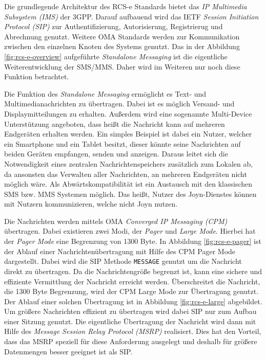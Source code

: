 \documentclass[german,12pt,a4paper]{article}
\begin{document}
    Die grundlegende Architektur des RCS-e Standards bietet das \textit{IP Multimedia Subsystem
    (IMS)} der 3GPP. Darauf aufbauend wird das IETF \textit{Session Initiation Protocol (SIP)} zur
    Authentifizierung, Autorisierung, Registrierug und Abrechnung genutzt. Weitere OMA Standards
    werden zur Kommunikation zwischen den einzelnen Knoten des Systems genutzt. Das in der Abbildung
    \ref{fig:rcs-e-overview} aufgeführte \textit{Standalone Messaging} ist die eigentliche
    Weiterentwicklung der SMS/MMS. Daher wird im Weiteren nur noch diese Funktion betrachtet.

    Die Funktion des \textit{Standalone Messaging} ermöglicht es Text- und Multimedianachrichten
    zu übertragen. Dabei ist es möglich Versand- und Displaymitteilungen zu erhalten. Außerdem wird
    eine sogenannte Multi-Device Unterstützung angeboten, dass heißt die Nachricht kann auf
    mehreren Endgeräten erhalten werden. Ein simples Beispiel ist dabei ein Nutzer, welcher ein
    Smartphone und ein Tablet besitzt, dieser könnte seine Nachrichten auf beiden Geräten
    empfangen, senden und anzeigen. Daraus leitet sich die Notwendigkeit eines zentralen
    Nachrichtenspeichers zusätzlich zum Lokalen ab, da ansonsten das Verwalten aller
    Nachrichten, an mehreren Endgeräten nicht möglich wäre. Als Abwärtskompatibilität ist
    ein Austausch mit den klassischen SMS bzw. MMS Systemen möglich. Das heißt, Nutzer des
    Joyn-Dienstes können mit Nutzern kommunizieren, welche nicht Joyn nutzen.

    Die Nachrichten werden mittels OMA \textit{Converged IP Messaging (CPM)} übertragen. Dabei
    existieren zwei Modi, der \textit{Pager} und \textit{Large Mode}. Hierbei hat der
    \textit{Pager Mode} eine Begrenzung von 1300 Byte. In Abbildung \ref{fig:rcs-e-pager} ist
    der Ablauf einer Nachrichtenübertragung mit Hilfe des CPM Pager Mode dargestellt. Dabei wird
    die SIP Methode \texttt{MESSAGE} genutzt um die Nachricht direkt zu übertragen. Da die
    Nachrichtengröße begrenzt ist, kann eine sichere und effiziente Vermittlung der Nachricht
    erreicht werden. Überschreitet die Nachricht, die 1300 Byte Begrenzung, wird der CPM
    Large Mode zur Übertragung genutzt. Der Ablauf einer solchen Übertragung ist in
    Abbildung \ref{fig:rcs-e-large} abgebildet. Um größere Nachrichten effizient zu übertragen
    wird dabei SIP nur zum Aufbau einer Sitzung genutzt. Die eigentliche Übertragung der Nachricht
    wird dann mit Hilfe des \textit{Message Session Relay Protocol (MSRP)} realisiert. Dies
    hat den Vorteil, dass das MSRP speziell für diese Anforderung ausgelegt und deshalb
    für größere Datenmengen besser geeignet ist als SIP.
\end{document}
